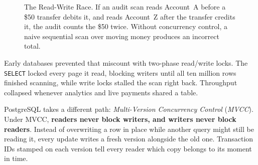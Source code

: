 \begin{figure}[htbp]
\centering
{}
\caption{The Read-Write Race. If an audit scan reads Account~A before a \$50 transfer debits it, and reads Account~Z after the transfer credits it, the audit counts the \$50 twice. Without concurrency control, a naive sequential scan over moving money produces an incorrect total.}
\label{ch05:fig-read-write-race}
\end{figure}



Early databases prevented that miscount with two-phase read/write locks. The \texttt{SELECT} locked every page it read, blocking writers until all ten million rows finished scanning, while write locks stalled the scan right back. Throughput collapsed whenever analytics and live payments shared a table.

PostgreSQL takes a different path: \emph{Multi-Version Concurrency Control} (\emph{MVCC}). Under MVCC, \textbf{readers never block writers, and writers never block readers}. Instead of overwriting a row in place while another query might still be reading it, every update writes a fresh version alongside the old one. Transaction IDs stamped on each version tell every reader which copy belongs to its moment in time.

